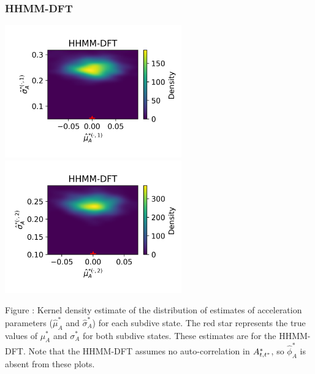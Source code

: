 \documentclass{article}
\begin{document}
        \subsubsection{HHMM-DFT}
        \begin{center}
        \includegraphics[width=3in]{../Plots/hhmm_FV_uncorr_MLE_density_A_0_0.png}
        \includegraphics[width=3in]{../Plots/hhmm_FV_uncorr_MLE_density_A_0_1.png}
        \end{center}
        
        \noindent Figure : Kernel density estimate of the distribution of estimates of acceleration parameters ($\hat \mu^*_A$ and $\hat \sigma^*_A$) for each subdive state. The red star represents the true values of $\mu^*_A$ and $\sigma^*_A$ for both subdive states. These estimates are for the HHMM-DFT. Note that the HHMM-DFT assumes no auto-correlation in $A^*_{t,t^*}$, so $\hat \phi^*_A$ is absent from these plots.
        \addtocounter{fignum}{1}
        
\end{document}
